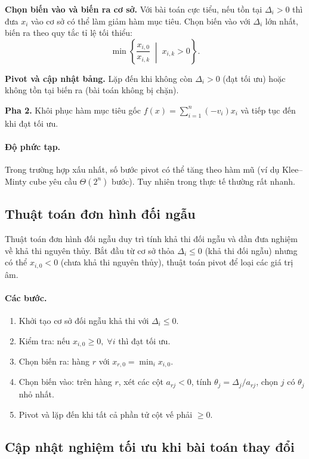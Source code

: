 \textbf{Chọn biến vào và biến ra cơ sở.} Với bài toán cực tiểu, nếu tồn tại $\Delta_i>0$ thì đưa $x_i$ vào cơ sở có thể làm giảm hàm mục tiêu. Chọn biến vào với $\Delta_i$ lớn nhất, biến ra theo quy tắc tỉ lệ tối thiểu:
\[
\min \left\{ \frac{x_{i,0}}{x_{i,k}} \;\middle|\; x_{i,k}>0 \right\}.
\]

\textbf{Pivot và cập nhật bảng.} Lặp đến khi không còn $\Delta_i>0$ (đạt tối ưu) hoặc không tồn tại biến ra (bài toán không bị chặn).

\textbf{Pha 2.} Khôi phục hàm mục tiêu gốc $f(x)=\sum_{i=1}^{n} (-v_i)x_i$ và tiếp tục đến khi đạt tối ưu.

\paragraph{Độ phức tạp.} Trong trường hợp xấu nhất, số bước pivot có thể tăng theo hàm mũ (ví dụ Klee--Minty cube yêu cầu $\Theta(2^n)$ bước). Tuy nhiên trong thực tế thường rất nhanh.

\subsection{Thuật toán đơn hình đối ngẫu}

Thuật toán đơn hình đối ngẫu duy trì tính khả thi đối ngẫu và dần đưa nghiệm về khả thi nguyên thủy. Bắt đầu từ cơ sở thỏa $\Delta_i \le 0$ (khả thi đối ngẫu) nhưng có thể $x_{i,0}<0$ (chưa khả thi nguyên thủy), thuật toán pivot để loại các giá trị âm.

\paragraph{Các bước.}
\begin{enumerate}
    \item Khởi tạo cơ sở đối ngẫu khả thi với $\Delta_i \le 0$.
    \item Kiểm tra: nếu $x_{i,0}\ge 0,\;\forall i$ thì đạt tối ưu.
    \item Chọn biến ra: hàng $r$ với $x_{r,0}=\min_i x_{i,0}$.
    \item Chọn biến vào: trên hàng $r$, xét các cột $a_{rj}<0$, tính $\theta_j=\Delta_j/a_{rj}$, chọn $j$ có $\theta_j$ nhỏ nhất.
    \item Pivot và lặp đến khi tất cả phần tử cột vế phải $\ge 0$.
\end{enumerate}

\subsection{Cập nhật nghiệm tối ưu khi bài toán thay đổi}

